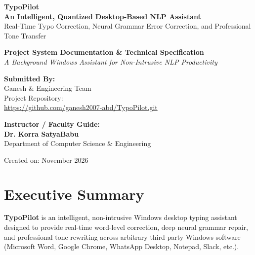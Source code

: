\documentclass[11pt,a4paper]{article}
\begin{document}
\begin{titlepage}
    \centering
    \vspace*{1.5cm}
    
    {\Huge \bfseries \color{teal!80!black} TypoPilot} \\[0.4cm]
    {\Large \textbf{An Intelligent, Quantized Desktop-Based NLP Assistant}} \\[0.2cm]
    {\large Real-Time Typo Correction, Neural Grammar Error Correction, and Professional Tone Transfer} \\[2cm]
    
    \begin{tcolorbox}[colback=teal!5!white,colframe=teal!75!black,arc=4mm,width=0.92\textwidth]
        \centering
        \textbf{\large Project System Documentation \& Technical Specification} \\[0.15cm]
        \textit{A Background Windows Assistant for Non-Intrusive NLP Productivity}
    \end{tcolorbox}
    
    \vspace{2.5cm}
    
    \begin{minipage}{0.48\textwidth}
        \flushleft
        \textbf{Submitted By:} \\[0.1cm]
        Ganesh \& Engineering Team \\[0.1cm]
        Project Repository: \\
        \url{https://github.com/ganesh2007-abd/TypoPilot.git}
    \end{minipage}
    \hfill
    \begin{minipage}{0.48\textwidth}
        \flushright
        \textbf{Instructor / Faculty Guide:} \\[0.1cm]
        \textbf{Dr. Korra SatyaBabu} \\[0.1cm]
        Department of Computer Science \& Engineering
    \end{minipage}
    
    \vfill
    {\small Created on: November 2026}
\end{titlepage}

\tableofcontents
\newpage

\section{Executive Summary}
\textbf{TypoPilot} is an intelligent, non-intrusive Windows desktop typing assistant designed to provide real-time word-level correction, deep neural grammar repair, and professional tone rewriting across arbitrary third-party Windows software (Microsoft Word, Google Chrome, WhatsApp Desktop, Notepad, Slack, etc.).
\end{document}
